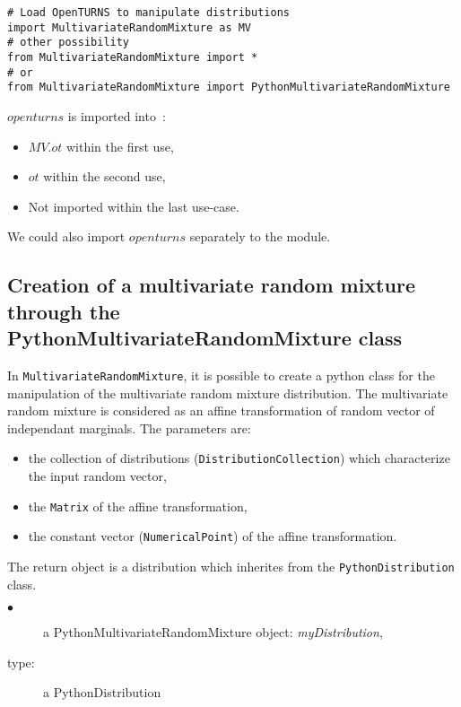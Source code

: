 \begin{lstlisting}
# Load OpenTURNS to manipulate distributions
import MultivariateRandomMixture as MV
# other possibility
from MultivariateRandomMixture import *
# or
from MultivariateRandomMixture import PythonMultivariateRandomMixture
\end{lstlisting}
$openturns$ is imported into~: 
\begin{itemize}
   \item $MV.ot$ within the first use,
   \item $ot$ within the second use,
   \item Not imported within the last use-case.
\end{itemize}

We could also import $openturns$ separately to the module.


\subsection{Creation of a multivariate random mixture through the PythonMultivariateRandomMixture class} \label{MVRM}

In \texttt{MultivariateRandomMixture}, it is possible to create a python class for the manipulation of the multivariate random mixture distribution.
The multivariate random mixture is considered as an affine transformation of random vector of independant marginals. 
The parameters are:
\begin{itemize}
 \item the collection of distributions (\texttt{DistributionCollection}) which characterize the input random vector,
 \item the \texttt{Matrix} of the affine transformation, 
 \item the constant vector (\texttt{NumericalPoint}) of the affine transformation.
\end{itemize}

The return object is a distribution which inherites from the \texttt{PythonDistribution} class.

{
  \begin{description}
  \item[$\bullet$] a PythonMultivariateRandomMixture object: \textit{myDistribution},
  \item[type:] a PythonDistribution
  \end{description}
}

